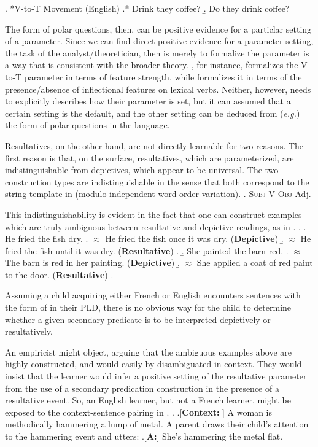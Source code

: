\documentclass[MilwayThesis]{subfiles}
\begin{document}
\ex. *V-to-T Movement (English)
\a.* Drink they coffee?
\b. Do they drink coffee?

The form of polar questions, then, can be positive evidence for a particlar setting of a parameter.
Since we can find direct positive evidence for a parameter setting, the task of the analyst/theoretician, then is merely to formalize the parameter is a way that is consistent with the broader theory.
\textcite{chomsky1995minimalist}, for instance, formalizes the V-to-T parameter in terms of feature strength, while \textcite{lasnik1999verbal} formalizes it in terms of the presence/absence of inflectional features on lexical verbs.
Neither, however, needs to explicitly describes how their parameter is set, but it can assumed that a certain setting is the default, and the other setting can be deduced from (\textit{e.g.}) the form of polar questions in the language.

Resultatives, on the other hand, are not directly learnable for two reasons.
The first reason is that, on the surface, resultatives, which are parameterized, are indistinguishable from depictives, which appear to be universal.
The two construction types are indistinguishable in the sense that both correspond to the string template in \Next (modulo independent word order variation).
\ex. \textsc{Subj} V \textsc{Obj} Adj.

This indistinguishability is evident in the fact that one can construct examples which are truly ambiguous between resultative and depictive readings, as in \Next.
\ex. 
\a. He fried the fish dry.
\a. $\approx$ He fried the fish once it was dry. (\textbf{Depictive})
\b. $\approx$ He fried the fish until it was dry. (\textbf{Resultative})
\z.
\b. She painted the barn red.
\a. $\approx$ The barn is red in her painting. (\textbf{Depictive})
\b. $\approx$ She applied a coat of red paint to the door. (\textbf{Resultative})
\z.

Assuming a child acquiring either French or English encounters sentences with the form of \LLast in their PLD, there is no obvious way for the child to determine whether a given secondary predicate is to be interpreted depictively or resultatively.

An empiricist might object, arguing that the ambiguous examples above are highly constructed, and would easily by disambiguated in context.
They would insist that the learner would infer a positive setting of the resultative parameter from the use of a secondary predication construction in the presence of a resultative event.
So, an English learner, but not a French learner, might be exposed to the context-sentence pairing in \Next.
\ex. 
\a.[\textbf{Context:} ] A woman is methodically hammering a lump of metal.
A parent draws their child's attention to the hammering event and utters:
\b.[\textbf{A:}] She's hammering the metal flat.
\end{document}
